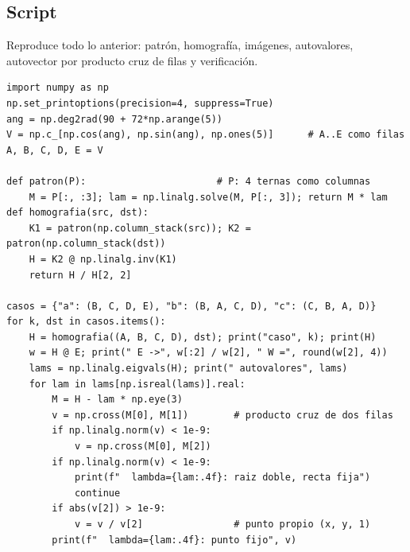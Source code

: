 \subsection{Script}
Reproduce todo lo anterior: patrón, homografía, imágenes, autovalores, autovector por
producto cruz de filas y verificación.
\begin{verbatim}
import numpy as np
np.set_printoptions(precision=4, suppress=True)
ang = np.deg2rad(90 + 72*np.arange(5))
V = np.c_[np.cos(ang), np.sin(ang), np.ones(5)]      # A..E como filas
A, B, C, D, E = V

def patron(P):                       # P: 4 ternas como columnas
    M = P[:, :3]; lam = np.linalg.solve(M, P[:, 3]); return M * lam
def homografia(src, dst):
    K1 = patron(np.column_stack(src)); K2 = patron(np.column_stack(dst))
    H = K2 @ np.linalg.inv(K1)
    return H / H[2, 2]

casos = {"a": (B, C, D, E), "b": (B, A, C, D), "c": (C, B, A, D)}
for k, dst in casos.items():
    H = homografia((A, B, C, D), dst); print("caso", k); print(H)
    w = H @ E; print(" E ->", w[:2] / w[2], " W =", round(w[2], 4))
    lams = np.linalg.eigvals(H); print(" autovalores", lams)
    for lam in lams[np.isreal(lams)].real:
        M = H - lam * np.eye(3)
        v = np.cross(M[0], M[1])        # producto cruz de dos filas
        if np.linalg.norm(v) < 1e-9:
            v = np.cross(M[0], M[2])
        if np.linalg.norm(v) < 1e-9:
            print(f"  lambda={lam:.4f}: raiz doble, recta fija")
            continue
        if abs(v[2]) > 1e-9:
            v = v / v[2]                # punto propio (x, y, 1)
        print(f"  lambda={lam:.4f}: punto fijo", v)
\end{verbatim}

